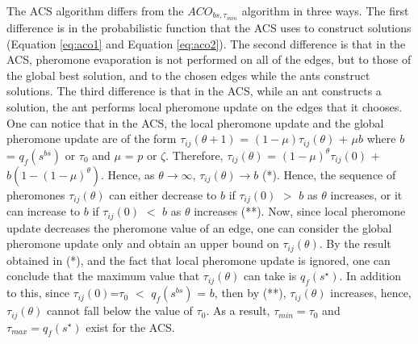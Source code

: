 \documentclass[12pt]{article}
\numberwithin{equation}{subsection}
\numberwithin{table}{subsection}
\numberwithin{algorithm}{subsection}
\numberwithin{figure}{subsection}
\begin{document}
The ACS algorithm differs from the $ACO_{bs, \tau_{min}}$ algorithm in three ways. The first difference is in the probabilistic function that the ACS uses to construct solutions (Equation \ref{eq:aco1} and Equation \ref{eq:aco2}). The second difference is that in the ACS, pheromone evaporation is not performed on all of the edges, but to those of the global best solution, and to the chosen edges while the ants construct solutions. The third difference is that in the ACS, while an ant constructs a solution, the ant performs local pheromone update on the edges that it chooses. One can notice that in the ACS, the local pheromone update and the global pheromone update are of the form $\tau_{ij}(\theta +1)$ = $(1-\mu)\tau_{ij}(\theta)$ + $\mu$$b$ where $b$ = $q_f(s^{bs})$ or $\tau_0$ and $\mu$ = $p$ or $\zeta$. Therefore, $\tau_{ij}(\theta)$ = $(1-\mu)^\theta\tau_{ij}(0)$ + $b(1-(1-\mu)^\theta)$. Hence, as $\theta\to\infty$,  $\tau_{ij}(\theta)\to b$ (*). Hence, the sequence of pheromones $\tau_{ij}(\theta)$ can either decrease to $b$ if $\tau_{ij}(0)$ $>$ $b$ as $\theta$ increases, or it can increase to $b$ if $\tau_{ij}(0)$ $<$ $b$ as $\theta$ increases (**). Now, since local pheromone update decreases the pheromone value of an edge, one can consider the global pheromone update only and obtain an upper bound on $\tau_{ij}(\theta)$. By the result obtained in (*), and the fact that local pheromone update is ignored, one can conclude that the maximum value that $\tau_{ij}(\theta)$ can take is $q_f(s^\star)$. In addition to this, since $\tau_{ij}(0)$=$\tau_0$ $<$ $q_f(s^{bs})$ = $b$, then by (**), $\tau_{ij}(\theta)$ increases, hence, $\tau_{ij}(\theta)$ cannot fall below the value of $\tau_0$. As a result, $\tau_{min} = \tau_0$ and $\tau_{max} = q_f(s^\star)$ exist for the ACS. \cite{dorigo_stutzle_thomas_2004}\\\\
$$
\end{document}

